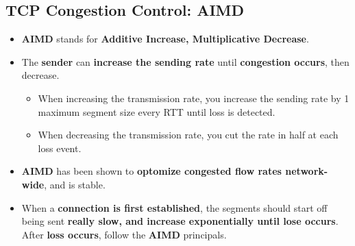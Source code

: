 \documentclass[16pt]{article}
\begin{document}
    \subsection*{TCP Congestion Control: AIMD}
    \begin{itemize}
        \item \textbf{AIMD} stands for \textbf{Additive Increase, Multiplicative Decrease}.
        \item The \textbf{sender} can \textbf{increase the sending rate} until \textbf{congestion occurs}, then decrease.
        \begin{itemize}
            \item When increasing the transmission rate, you increase the sending rate by 1 maximum segment size every RTT until loss is detected.
            \item When decreasing the transmission rate, you cut the rate in half at each loss event.
        \end{itemize}
        \item \textbf{AIMD} has been shown to \textbf{optomize congested flow rates network-wide}, and is stable.
        \item When a \textbf{connection is first established}, the segments should start off being sent \textbf{really slow, and increase exponentially until lose occurs}. After \textbf{loss occurs}, follow the \textbf{AIMD} principals.
    \end{itemize}
\end{document}
